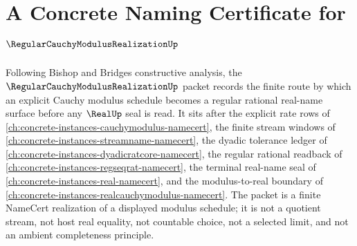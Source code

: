 \chapter{A Concrete Naming Certificate for $\RegularCauchyModulusRealizationUp$}
\label{ch:concrete-instances-regular-cauchy-modulus-realization-namecert}

Following Bishop and Bridges constructive analysis, the $\RegularCauchyModulusRealizationUp$ packet records the finite route by which an explicit Cauchy modulus schedule becomes a regular rational real-name surface before any $\RealUp$ seal is read. It sits after the explicit rate rows of \autoref{ch:concrete-instances-cauchymodulus-namecert}, the finite stream windows of \autoref{ch:concrete-instances-streamname-namecert}, the dyadic tolerance ledger of \autoref{ch:concrete-instances-dyadicratcore-namecert}, the regular rational readback of \autoref{ch:concrete-instances-regseqrat-namecert}, the terminal real-name seal of \autoref{ch:concrete-instances-real-namecert}, and the modulus-to-real boundary of \autoref{ch:concrete-instances-realcauchymodulus-namecert}. The packet is a finite NameCert realization of a displayed modulus schedule; it is not a quotient stream, not host real equality, not countable choice, not a selected limit, and not an ambient completeness principle.

